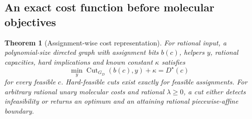 \documentclass[10pt,letterpaper]{article}
\newtheorem{theorem}[proposition]{Theorem}
\begin{document}
\subsection{An exact cost function before molecular objectives}
\begin{samepage}
\begin{theorem}[Assignment-wise cost representation]\label{thm:cost}
For rational input, a polynomial-size directed graph with assignment bits $b(c)$, helpers $y$, rational capacities, hard implications and known constant $\kappa$ satisfies
\begin{equation}
\min_y\operatorname{Cut}_{G_D}(b(c),y)+\kappa=D^\star(c)\label{eq:identity}
\end{equation}
for every feasible $c$. Hard-feasible cuts exist exactly for feasible assignments. For arbitrary rational unary molecular costs and rational $\lambda\ge0$, a cut either detects infeasibility or returns an optimum and an attaining rational piecewise-affine boundary.
\end{theorem}
\end{samepage}
\end{document}
